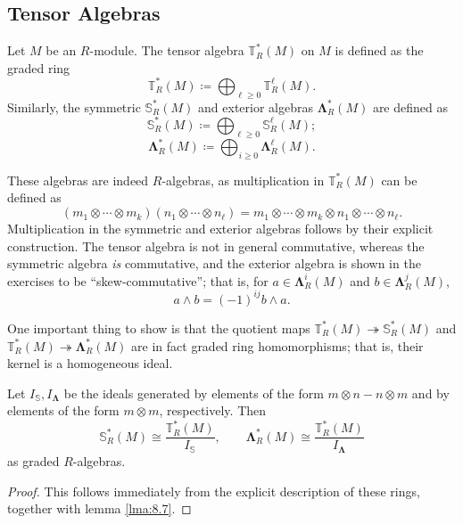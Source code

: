 \subsection{Tensor Algebras}
\begin{definition}\label{dfn:8.19}
	Let $M$ be an $R$-module. The tensor algebra $\mathbb{T}_R^*(M)$ on $M$ is defined as the graded ring
	\[
		\mathbb{T}_R^*(M)\coloneqq \bigoplus_{\ell \geq 0}\mathbb{T}_R^{\ell }(M)
	.\]
	Similarly, the symmetric $\mathbb{S}_R^*(M)$ and exterior algebras $\boldsymbol{\Lambda}_R^*(M)$ are defined as
	\[
		\mathbb{S}_R^*(M)\coloneqq \bigoplus_{\ell \geq 0}\mathbb{S}_R^{\ell } (M)
	;\]
	\[
		\boldsymbol{\Lambda}_R^*(M)\coloneqq \bigoplus_{i\geq 0}\boldsymbol{\Lambda}_R^\ell (M)
	.\]
\end{definition}

These algebras are indeed $R$-algebras, as multiplication in $\mathbb{T}_R^*(M)$ can be defined as
\[
	\left( m_1 \otimes \cdots  \otimes m_k\right) \left( n_1 \otimes \cdots \otimes n_\ell  \right) = m_1 \otimes \cdots  \otimes m_k \otimes  n_1 \otimes \cdots \otimes n_\ell
.\]
Multiplication in the symmetric and exterior algebras follows by their explicit construction. The tensor algebra is not in general commutative, whereas the symmetric algebra \emph{is} commutative, and the exterior algebra is shown in the exercises to be ``skew-commutative''; that is, for $a\in \boldsymbol{\Lambda}_R^i(M)$ and $b\in \boldsymbol{\Lambda}_R^j(M)$,
\[
	a\wedge b=(-1)^{ij} b\wedge a
.\]

One important thing to show is that the quotient maps $\mathbb{T}_R^*(M)\twoheadrightarrow \mathbb{S}_R^*(M)$ and $\mathbb{T} _R^*(M)\twoheadrightarrow \boldsymbol{\Lambda}_R^*(M)$ are in fact graded ring homomorphisms; that is, their kernel is a homogeneous ideal.

\begin{lemma}\label{lma:8.8}
	Let $I_\mathbb{S} ,I_{\boldsymbol{\Lambda}} $ be the ideals generated by elements of the form $m\otimes n-n\otimes m$ and by elements of the form $m\otimes m$, respectively. Then
	\[
		\mathbb{S}_R^*(M)\cong \frac{\mathbb{T} _R^*(M)}{I_\mathbb{S} } ,\qquad \boldsymbol{\Lambda}_R^*(M)\cong \frac{\mathbb{T}_R^*(M)}{I_{\boldsymbol{\Lambda}} } 
	\]
	as graded $R$-algebras.
\end{lemma}
\begin{proof}
	This follows immediately from the explicit description of these rings, together with lemma \ref{lma:8.7}.
\end{proof}

